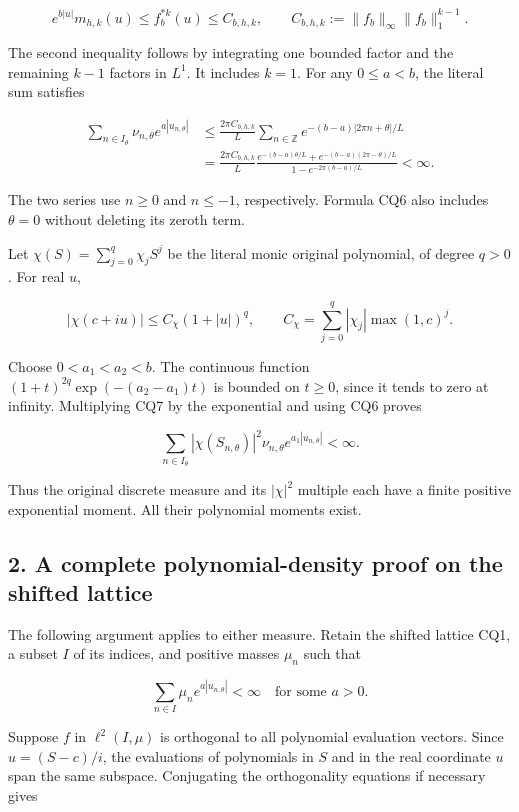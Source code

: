 \[
e^{b|u|}m_{h,k}(u)
\le f_b^{*k}(u)
\le C_{b,h,k},\qquad
C_{b,h,k}:=\|f_b\|_\infty\|f_b\|_1^{k-1}.
\tag{CQ5}
\]

The second inequality follows by integrating one bounded factor and the remaining \(k-1\) factors in \(L^1\). It includes \(k=1\). For any \(0 \le a < b\), the literal sum satisfies

\[
\begin{aligned}
\sum_{n\in I_\theta}\nu_{n,\theta}e^{a|u_{n,\theta}|}
&\le\frac{2\pi C_{b,h,k}}L
\sum_{n\in\mathbb Z}e^{-(b-a)|2\pi n+\theta|/L}\\
&=\frac{2\pi C_{b,h,k}}L
\frac{e^{-(b-a)\theta/L}+e^{-(b-a)(2\pi-\theta)/L}}
{1-e^{-2\pi(b-a)/L}}<\infty.
\end{aligned}
\tag{CQ6}
\]

The two series use \(n \ge 0\) and \(n \le -1\), respectively. Formula CQ6 also includes \(\theta=0\) without deleting its zeroth term.

Let \(\chi(S)=\sum_{j=0}^q \chi_j S^j\) be the literal monic original polynomial, of degree \(q>0\). For real \(u\),

\[
|\chi(c+iu)|\le
C_\chi(1+|u|)^q,\qquad
C_\chi=\sum_{j=0}^q|\chi_j|\max(1,c)^j.
\tag{CQ7}
\]

Choose \(0 < a_1 < a_2 < b\). The continuous function \((1+t)^{2q} \exp(-(a_2-a_1)t)\) is bounded on \(t \ge 0\), since it tends to zero at infinity. Multiplying CQ7 by the exponential and using CQ6 proves

\[
\sum_{n\in I_\theta}
|\chi(S_{n,\theta})|^2\nu_{n,\theta}
e^{a_1|u_{n,\theta}|}<\infty.
\tag{CQ8}
\]

Thus the original discrete measure and its \(|\chi|^2\) multiple each have a finite positive exponential moment. All their polynomial moments exist.

\subsection{2. A complete polynomial-density proof on the shifted lattice}\label{a-complete-polynomial-density-proof-on-the-shifted-lattice}

The following argument applies to either measure. Retain the shifted lattice CQ1, a subset \(I\) of its indices, and positive masses \(\mu_n\) such that

\[
\sum_{n\in I}\mu_ne^{a|u_{n,\theta}|}<\infty
\quad\text{for some }a>0.
\tag{CQ9}
\]

Suppose \(f\) in \(\ell^2(I,\mu)\) is orthogonal to all polynomial evaluation vectors. Since \(u=(S-c)/i\), the evaluations of polynomials in \(S\) and in the real coordinate \(u\) span the same subspace. Conjugating the orthogonality equations if necessary gives

